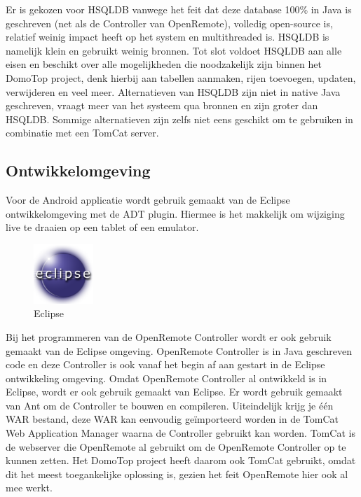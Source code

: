 \documentclass[]{article}
\begin{document}
Er is gekozen voor HSQLDB vanwege het feit dat deze database 100\% in Java
is geschreven (net als de Controller van OpenRemote), volledig open-source is,
relatief weinig impact heeft op het system en multithreaded is.
HSQLDB is namelijk klein en gebruikt weinig bronnen. Tot slot voldoet
HSQLDB aan alle eisen en beschikt over alle mogelijkheden die noodzakelijk
zijn binnen het DomoTop project, denk hierbij aan tabellen aanmaken, rijen
toevoegen, updaten, verwijderen en veel meer. Alternatieven van HSQLDB zijn
niet in native Java geschreven,  vraagt meer van het systeem qua
bronnen en zijn groter dan HSQLDB. Sommige alternatieven zijn zelfs niet
eens geschikt om te gebruiken in combinatie met een TomCat server.

\subsection{Ontwikkelomgeving}
Voor de Android applicatie wordt gebruik gemaakt van de Eclipse
ontwikkelomgeving met de ADT plugin. Hiermee is het makkelijk om wijziging
live te draaien op een tablet of een emulator.

\begin{figure}
  \begin{center}
    \includegraphics[width=0.20\textwidth]{eclipse.pdf}
  \end{center}
  \caption{Eclipse}
\end{figure}

Bij het programmeren van de OpenRemote Controller wordt er ook gebruik gemaakt
van de Eclipse omgeving. OpenRemote Controller is in Java geschreven code
en deze Controller is ook vanaf het begin af aan gestart in de Eclipse
ontwikkeling omgeving. Omdat OpenRemote Controller al ontwikkeld is in
Eclipse, wordt er ook gebruik gemaakt van Eclipse. Er wordt gebruik gemaakt van Ant om de Controller te bouwen en compileren. Uiteindelijk krijg
je \'e\'en WAR bestand, deze WAR kan eenvoudig ge\"importeerd worden in de TomCat
Web Application Manager waarna de Controller gebruikt kan worden. TomCat is
de webserver die OpenRemote al gebruikt om de OpenRemote Controller op te
kunnen zetten. Het DomoTop project heeft daarom ook TomCat gebruikt, omdat
dit het meest toegankelijke oplossing is, gezien het feit OpenRemote hier
ook al mee werkt.
\end{document}
